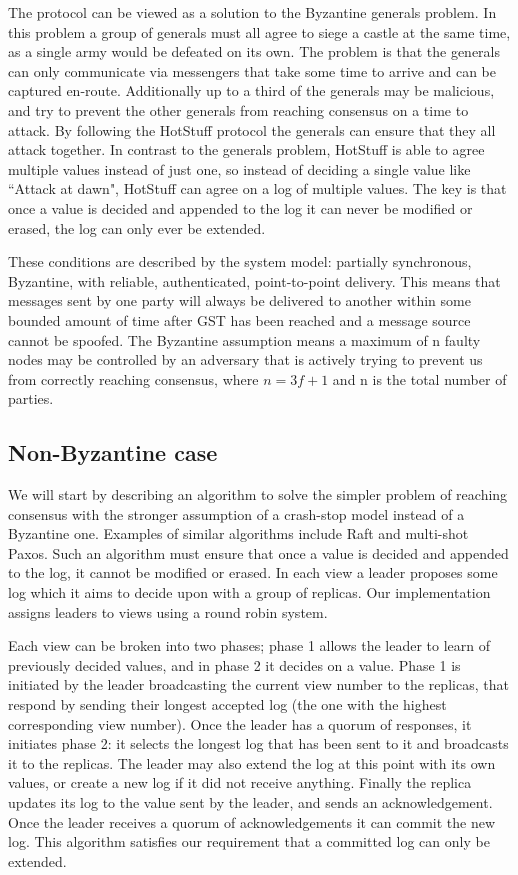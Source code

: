 The protocol can be viewed as a solution to the Byzantine generals problem. In this problem a group of generals must all agree to siege a castle at the same time, as a single army would be defeated on its own. The problem is that the generals can only communicate via messengers that take some time to arrive and can be captured en-route. Additionally up to a third of the generals may be malicious, and try to prevent the other generals from reaching consensus on a time to attack. By following the HotStuff protocol the generals can ensure that they all attack together. In contrast to the generals problem, HotStuff is able to agree multiple values instead of just one, so instead of deciding a single value like ``Attack at dawn", HotStuff can agree on a log of multiple values. The key is that once a value is decided and appended to the log it can never be modified or erased, the log can only ever be extended.

These conditions are described by the system model: partially synchronous, Byzantine, with reliable, authenticated, point-to-point delivery. This means that messages sent by one party will always be delivered to another within some bounded amount of time after GST has been reached and a message source cannot be spoofed. The Byzantine assumption means a maximum of n faulty nodes may be controlled by an adversary that is actively trying to prevent us from correctly reaching consensus, where $n = 3f + 1$ and n is the total number of parties.

\subsection{Non-Byzantine case}
We will start by describing an algorithm to solve the simpler problem of reaching consensus with the stronger assumption of a crash-stop model instead of a Byzantine one. Examples of similar algorithms include Raft and multi-shot Paxos. Such an algorithm must ensure that once a value is decided and appended to the log, it cannot be modified or erased. In each view a leader proposes some log which it aims to decide upon with a group of replicas. Our implementation assigns leaders to views using a round robin system.

Each view can be broken into two phases; phase 1 allows the leader to learn of previously decided values, and in phase 2 it decides on a value. Phase 1 is initiated by the leader broadcasting the current view number to the replicas, that respond by sending their longest accepted log (the one with the highest corresponding view number). Once the leader has a quorum of responses, it initiates phase 2: it selects the longest log that has been sent to it and broadcasts it to the replicas. The leader may also extend the log at this point with its own values, or create a new log if it did not receive anything. Finally the replica updates its log to the value sent by the leader, and sends an acknowledgement. Once the leader receives a quorum of acknowledgements it can commit the new log. This algorithm satisfies our requirement that a committed log can only be extended.


